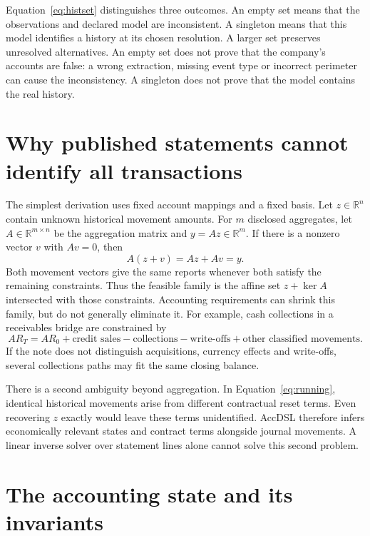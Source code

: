 Equation~\eqref{eq:histset} distinguishes three outcomes. An empty set means
that the observations and declared model are inconsistent. A singleton means
that this model identifies a history at its chosen resolution. A larger set
preserves unresolved alternatives. An empty set does not prove that the
company's accounts are false: a wrong extraction, missing event type or
incorrect perimeter can cause the inconsistency. A singleton does not prove
that the model contains the real history.

\section{Why published statements cannot identify all transactions}

The simplest derivation uses fixed account mappings and a fixed basis. Let
$z\in\mathbb{R}^n$ contain unknown historical movement amounts. For $m$
disclosed aggregates, let $A\in\mathbb{R}^{m\times n}$ be the aggregation
matrix and $y=Az\in\mathbb{R}^m$. If there is a nonzero vector $v$ with
$Av=0$, then
\[
 A(z+v)=Az+Av=y.
\]
Both movement vectors give the same reports whenever both satisfy the remaining
constraints. Thus the feasible family is the affine set $z+\ker A$ intersected
with those constraints. Accounting requirements can shrink this family, but
do not generally eliminate it. For example, cash collections in a receivables
bridge are constrained by
\[
 AR_T=AR_0+\text{credit sales}-\text{collections}
       -\text{write-offs}+\text{other classified movements}.
\]
If the note does not distinguish acquisitions, currency effects and write-offs,
several collections paths may fit the same closing balance.

There is a second ambiguity beyond aggregation. In
Equation~\eqref{eq:running}, identical historical movements arise from different
contractual reset terms. Even recovering $z$ exactly would leave these terms
unidentified. AccDSL therefore infers economically relevant states and
contract terms alongside journal movements. A linear inverse solver over
statement lines alone cannot solve this second problem.

\section{The accounting state and its invariants}

